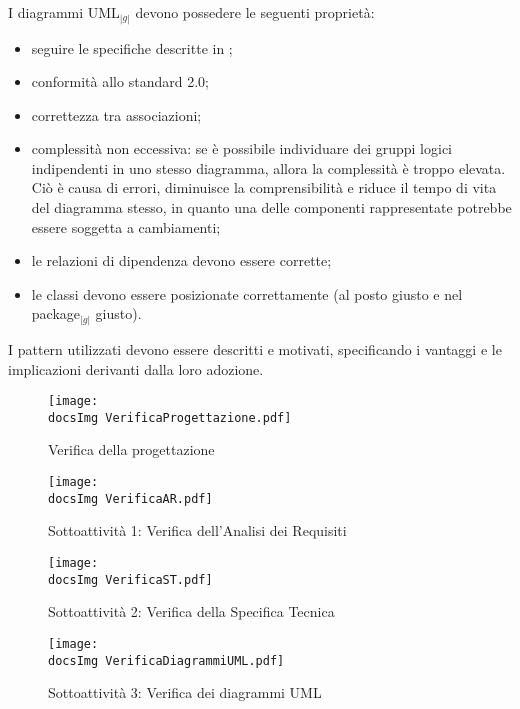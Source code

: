 {{{		I diagrammi UML$_{|g|}$ devono possedere le seguenti proprietà:
		\begin{itemize}
			\item seguire le specifiche descritte in \textit{\NormeDiProgetto};
			\item conformità allo standard 2.0;
			\item correttezza tra associazioni;
			\item complessità non eccessiva: se è possibile individuare dei gruppi logici indipendenti in uno stesso diagramma, 
			      allora la complessità è troppo elevata. Ciò è causa di errori, diminuisce la comprensibilità e riduce il 
			      tempo di vita del diagramma stesso, in quanto una delle componenti rappresentate potrebbe essere soggetta 
			      a cambiamenti;
			\item le relazioni di dipendenza devono essere corrette;
			\item le classi devono essere posizionate correttamente (al posto giusto e nel package$_{|g|}$ giusto).
		\end{itemize}
		I pattern utilizzati devono essere descritti e motivati, specificando i vantaggi e le implicazioni derivanti dalla loro adozione.
		\newpage
		\begin{figure}[h!]
			\centering
			\texttt{[image: \\docsImg VerificaProgettazione.pdf]}
			\caption{Verifica della progettazione}
		\end{figure}

		\begin{figure}[h!]
			\centering
			\texttt{[image: \\docsImg VerificaAR.pdf]}
			\caption{Sottoattività 1: Verifica dell'Analisi dei Requisiti}
		\end{figure}
		\newpage

		\begin{figure}[h!]
			\centering
			\texttt{[image: \\docsImg VerificaST.pdf]}
			\caption{Sottoattività 2: Verifica della Specifica Tecnica}
		\end{figure}

		\begin{figure}[h!]
			\centering
			\texttt{[image: \\docsImg VerificaDiagrammiUML.pdf]}
			\caption{Sottoattività 3: Verifica dei diagrammi UML}
		\end{figure}
	}

}}

